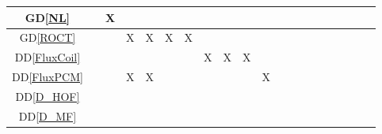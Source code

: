\documentclass[12pt]{article}
\newcommand{\dref}[1]{GD\ref{#1}}
\newcommand{\ddref}[1]{DD\ref{#1}}
\begin{document}
{\begin{landscape}
\begin{table}[h!]
\begin{tabular}{|c|c|c|c|c|c|c|c|c|c|c|c|c|c|c|c|c|c|c|c|}
                \dref{NL}           &                            & X               &                &               &                        &                  &                    &                &                 &                   &                 &                   &                     &                  &                &                   &               &                    &                   \\ \hline
                \dref{ROCT}         &                            &                 & X              & X             & X                      & X                &                    &                &                 &                   &                 &                   &                     &                  &                &                   &               &                    &                   \\ \hline
                \ddref{FluxCoil}    &                            &                 &                &               &                        &                  & X                  & X              & X               &                   &                 &                   &                     &                  &                &                   &               &                    &                   \\ \hline
                \ddref{FluxPCM}     &                            &                 & X              & X             &                        &                  &                    &                &                 & X                 &                 &                   &                     &                  &                &                   &               &                    &                   \\ \hline
                \ddref{D_HOF}       &                            &                 &                &               &                        &                  &                    &                &                 &                   &                 &                   &                     &                  &                &                   &               &                    &                   \\ \hline
                \ddref{D_MF}        &                            &                 &                &               &                        &                  &                    &                &                 &                   &                 &                   &                     &                  &                &                   &               &                    &                   \\ \hline

\end{tabular}
\end{table}
\end{landscape}}
\end{document}
